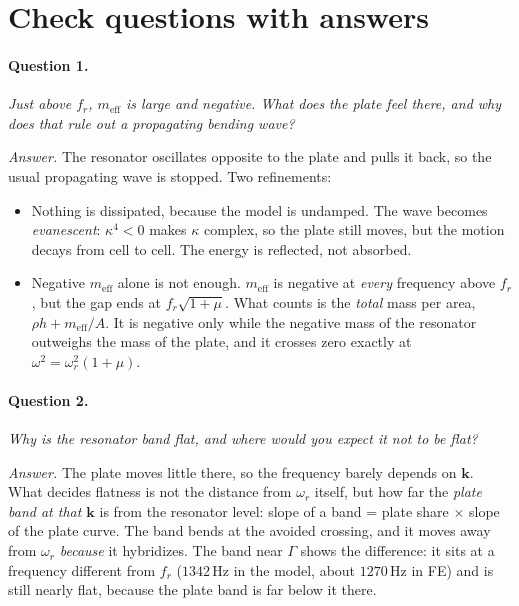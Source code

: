 \section{Check questions with answers}

\paragraph{Question 1.} \emph{Just above $f_r$, $m_\mathrm{eff}$ is large and
negative. What does the plate feel there, and why does that rule out a
propagating bending wave?}

\emph{Answer.} The resonator oscillates opposite to the plate and pulls it back,
so the usual propagating wave is stopped. Two refinements:
\begin{itemize}
  \item Nothing is dissipated, because the model is undamped. The wave becomes
        \emph{evanescent}: $\kappa^4 < 0$ makes $\kappa$ complex, so the plate
        still moves, but the motion decays from cell to cell. The energy is
        reflected, not absorbed.
  \item Negative $m_\mathrm{eff}$ alone is not enough. $m_\mathrm{eff}$ is
        negative at \emph{every} frequency above $f_r$, but the gap ends at
        $f_r\sqrt{1+\mu}$. What counts is the \emph{total} mass per area,
        $\rho h + m_\mathrm{eff}/A$. It is negative only while the negative
        mass of the resonator outweighs the mass of the plate, and it crosses
        zero exactly at $\omega^2 = \omega_r^2(1+\mu)$.
\end{itemize}

\paragraph{Question 2.} \emph{Why is the resonator band flat, and where would you
expect it not to be flat?}

\emph{Answer.} The plate moves little there, so the frequency barely depends on
$\mathbf{k}$. What decides flatness is not the distance from $\omega_r$ itself,
but how far the \emph{plate band at that $\mathbf{k}$} is from the resonator
level: slope of a band = plate share $\times$ slope of the plate curve. The
band bends at the avoided crossing, and it moves away from $\omega_r$
\emph{because} it hybridizes. The band near $\Gamma$ shows the difference: it
sits at a frequency different from $f_r$ ($1342\,\mathrm{Hz}$ in the model,
about $1270\,\mathrm{Hz}$ in FE) and is still nearly flat, because the plate
band is far below it there.

